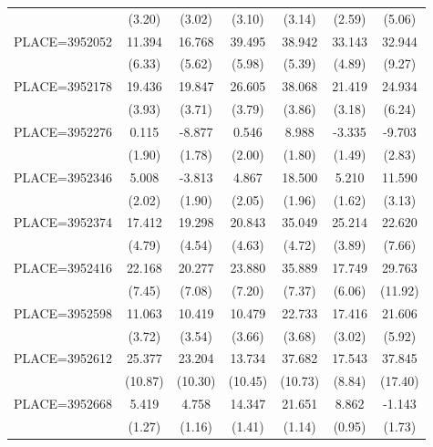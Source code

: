 {\begin{tabular}{l*{6}{c}}
                    &      (3.20)&      (3.02)&      (3.10)&      (3.14)&      (2.59)&      (5.06)\\
PLACE=3952052       &      11.394&      16.768&      39.495&      38.942&      33.143&      32.944\\
                    &      (6.33)&      (5.62)&      (5.98)&      (5.39)&      (4.89)&      (9.27)\\
PLACE=3952178       &      19.436&      19.847&      26.605&      38.068&      21.419&      24.934\\
                    &      (3.93)&      (3.71)&      (3.79)&      (3.86)&      (3.18)&      (6.24)\\
PLACE=3952276       &       0.115&      -8.877&       0.546&       8.988&      -3.335&      -9.703\\
                    &      (1.90)&      (1.78)&      (2.00)&      (1.80)&      (1.49)&      (2.83)\\
PLACE=3952346       &       5.008&      -3.813&       4.867&      18.500&       5.210&      11.590\\
                    &      (2.02)&      (1.90)&      (2.05)&      (1.96)&      (1.62)&      (3.13)\\
PLACE=3952374       &      17.412&      19.298&      20.843&      35.049&      25.214&      22.620\\
                    &      (4.79)&      (4.54)&      (4.63)&      (4.72)&      (3.89)&      (7.66)\\
PLACE=3952416       &      22.168&      20.277&      23.880&      35.889&      17.749&      29.763\\
                    &      (7.45)&      (7.08)&      (7.20)&      (7.37)&      (6.06)&     (11.92)\\
PLACE=3952598       &      11.063&      10.419&      10.479&      22.733&      17.416&      21.606\\
                    &      (3.72)&      (3.54)&      (3.66)&      (3.68)&      (3.02)&      (5.92)\\
PLACE=3952612       &      25.377&      23.204&      13.734&      37.682&      17.543&      37.845\\
                    &     (10.87)&     (10.30)&     (10.45)&     (10.73)&      (8.84)&     (17.40)\\
PLACE=3952668       &       5.419&       4.758&      14.347&      21.651&       8.862&      -1.143\\
                    &      (1.27)&      (1.16)&      (1.41)&      (1.14)&      (0.95)&      (1.73)\\

\end{tabular}}
